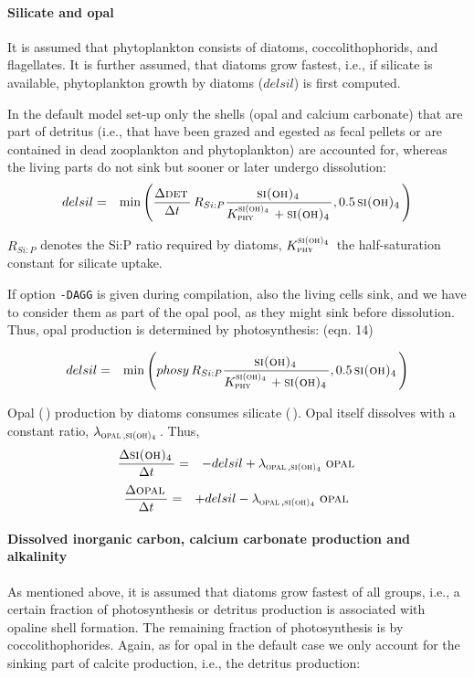 \documentclass[11pt,a4paper,fleqn,twoside]{article}
\def\sio{\text{\textsc{si(oh)$_4$}}\,}
\def\phy{\text{\textsc{phy}}\,}
\def\det{\text{\textsc{det}}\,}
\def\opal{\text{\textsc{opal}}\,}
\begin{document}
\paragraph{Silicate and opal}  It is assumed that phytoplankton consists of
diatoms, coccolithophorids, and flagellates. It is further assumed, that
diatoms grow fastest, i.e., if silicate is available,  phytoplankton 
growth by diatoms ($delsil$) is first computed. 

In the default model set-up only the shells (opal and calcium carbonate) that are part
of detritus (i.e., that have been grazed and egested as fecal pellets or are
contained in dead zooplankton and phytoplankton) are
accounted for, whereas the living parts do not sink but sooner or
later undergo dissolution:
\begin{eqnarray}
\label{eq_delsilnoagg}
delsil & = & \min\left( \frac{\Delta \det}{\Delta t}\, R_{Si:P} \frac{\sio}
{K_{\phy}^{\sio} + \sio}
, 0.5 \, \sio \right)
\end{eqnarray}

$R_{Si:P}$ denotes the Si:P ratio required by diatoms, $K_{\phy}^{\sio}$ the
half-saturation constant for silicate uptake.   

If option {\tt -DAGG} is given during compilation, also the living cells
sink, and we have to consider them as part of the opal pool, as they 
might sink before dissolution.
Thus, opal production is determined by photosynthesis:
(eqn. 14)

\begin{eqnarray}
\label{eq_delsilagg}
delsil & = & \min\left(phosy \, R_{Si:P} \frac{\sio}{K_{\phy}^{\sio} + \sio}
, 0.5 \, \sio \right)
\end{eqnarray}

Opal (\opal) production by diatoms consumes silicate (\sio). Opal itself
dissolves with a constant ratio, $\lambda_{\opal,\sio}$. Thus, 
\begin{eqnarray}
\label{eq_sio_sur}
\frac{\Delta \sio}{\Delta t} & = & -delsil + \lambda_{\opal,\sio} \, \opal
\end{eqnarray}
\begin{eqnarray}
\label{eq_opal_sur}
\frac{\Delta \opal}{\Delta t} & = & + delsil - \lambda_{\opal,\sio} \, \opal
\end{eqnarray}

\paragraph{Dissolved inorganic carbon, calcium carbonate production and
alkalinity}  As mentioned above, it is assumed that diatoms grow fastest of all
groups, i.e., a certain fraction of photosynthesis or detritus production is
associated with opaline shell formation. The remaining fraction of photosynthesis
is by coccolithophorides. Again, as for opal in the default case
we only account for the sinking part of calcite production, i.e., the 
detritus production:
\end{document}
